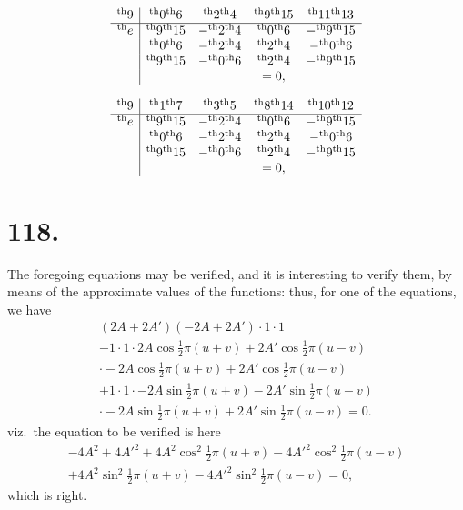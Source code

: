 \documentclass[11pt,a4paper]{book}
\providecommand{\uth}{\textsuperscript{th}}
\begin{document}
\[
\begin{array}{c|cccc}
\uth{9} & \uth{0}\uth{6} & \uth{2}\uth{4} & \uth{9}\uth{15} & \uth{11}\uth{13} \\
\hline
\uth{e} & \uth{9}\uth{15} & -\uth{2}\uth{4} & \uth{0}\uth{6} & -\uth{9}\uth{15} \\
& \uth{0}\uth{6} & -\uth{2}\uth{4} & \uth{2}\uth{4} & -\uth{0}\uth{6} \\
& \uth{9}\uth{15} & -\uth{0}\uth{6} & \uth{2}\uth{4} & -\uth{9}\uth{15} \\
& & & = 0,
\end{array}
\]

\[
\begin{array}{c|cccc}
\uth{9} & \uth{1}\uth{7} & \uth{3}\uth{5} & \uth{8}\uth{14} & \uth{10}\uth{12} \\
\hline
\uth{e} & \uth{9}\uth{15} & -\uth{2}\uth{4} & \uth{0}\uth{6} & -\uth{9}\uth{15} \\
& \uth{0}\uth{6} & -\uth{2}\uth{4} & \uth{2}\uth{4} & -\uth{0}\uth{6} \\
& \uth{9}\uth{15} & -\uth{0}\uth{6} & \uth{2}\uth{4} & -\uth{9}\uth{15} \\
& & & = 0,
\end{array}
\]

\newpage
\section*{118.}
\label{sec:118}

The foregoing equations may be verified, and it is interesting to verify them, by means of the approximate values of the functions: thus, for one of the equations, we have
\begin{multline*}
(2A + 2A')(-2A + 2A') \cdot 1 \cdot 1 \\
- 1 \cdot 1 \cdot 2A\cos\tfrac{1}{2}\pi(u+v) + 2A'\cos\tfrac{1}{2}\pi(u-v) \\
\cdot -2A\cos\tfrac{1}{2}\pi(u+v) + 2A'\cos\tfrac{1}{2}\pi(u-v) \\
+ 1 \cdot 1 \cdot -2A\sin\tfrac{1}{2}\pi(u+v) - 2A'\sin\tfrac{1}{2}\pi(u-v) \\
\cdot -2A\sin\tfrac{1}{2}\pi(u+v) + 2A'\sin\tfrac{1}{2}\pi(u-v) = 0.
\end{multline*}
viz.\ the equation to be verified is here
\begin{multline*}
-4A^2 + 4A'^2 + 4A^2\cos^2\tfrac{1}{2}\pi(u+v) - 4A'^2\cos^2\tfrac{1}{2}\pi(u-v) \\
+ 4A^2\sin^2\tfrac{1}{2}\pi(u+v) - 4A'^2\sin^2\tfrac{1}{2}\pi(u-v) = 0,
\end{multline*}
which is right.
\end{document}
